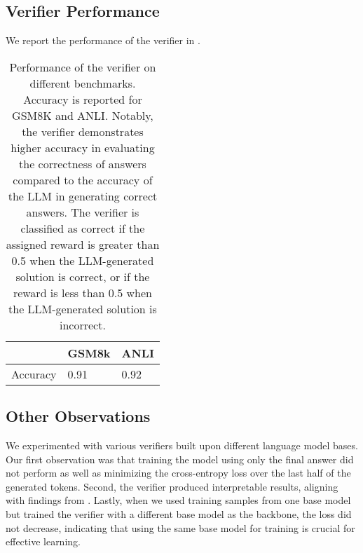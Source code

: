 \subsection{Verifier Performance}
We report the performance of the verifier in .

\begin{table}[h]
\centering
\begin{tabular}{|l|l|l|}
\hline
              & GSM8k & ANLI  \\ \hline
Accuracy      & 0.91  & 0.92   \\ \hline
\end{tabular}
\caption{Performance of the verifier on different benchmarks. Accuracy is reported for GSM8K and ANLI. Notably, the verifier demonstrates higher accuracy in evaluating the correctness of answers compared to the accuracy of the LLM in generating correct answers. The verifier is classified as correct if the assigned reward is greater than 0.5 when the LLM-generated solution is correct, or if the reward is less than 0.5 when the LLM-generated solution is incorrect.}
\label{table:verifier-perf}
\end{table}

\subsection{Other  Observations} 

We experimented with various verifiers built upon different language model bases. Our first observation was that training the model using only the final answer did not perform as well as minimizing the cross-entropy loss over the last half of the generated tokens. Second, the verifier produced interpretable results, aligning with findings from \citet{liu2023tinygsm}. Lastly, when we used training samples from one base model but trained the verifier with a different base model as the backbone, the loss did not decrease, indicating that using the same base model for training is crucial for effective learning.



